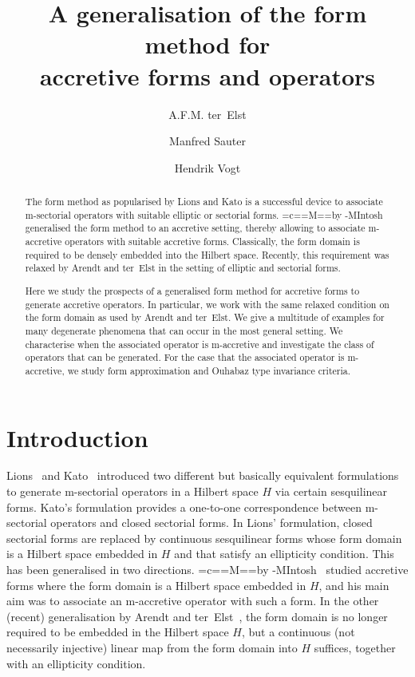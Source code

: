 \documentclass[a4paper,oneside,12pt]{amsart}
\title[The form method for accretive forms]{A generalisation of the form method for\\ accretive forms and operators}
\author{A.F.M. ter~Elst}
\author[M. Sauter]{Manfred Sauter}
\author[H. Vogt]{Hendrik Vogt}
\theoremstyle{plain}
\theoremstyle{definition}
\DeclareRobustCommand{\Mc}{\setbox0=\hbox{c}\mycheight=\ht0\setbox0=\hbox{M}\myMheight=\ht0\mycshift=\myMheight\advance\mycshift by -\mycheight\mbox{M\raisebox{\mycshift}{c}I}}
\DeclareRobustCommand{\McIntosh}{{\Mc}ntosh\xspace}
\begin{document}
\begin{abstract}
The form method as popularised by Lions and Kato is a successful device to associate {\ensuremath{\text{m}}}-sectorial operators with suitable elliptic or sectorial forms.
\McIntosh generalised the form method to an accretive setting, thereby allowing to associate {\ensuremath{\text{m}}}-accretive operators with suitable accretive forms.
Classically, the form domain is required to be densely embedded into the Hilbert space.
Recently, this requirement was relaxed by Arendt and ter~Elst 
in the setting of elliptic and sectorial forms.

Here we study the prospects of a generalised form method for accretive forms to generate accretive operators.
In particular, we work with the same relaxed condition on the form domain as used by Arendt and ter~Elst.
We give a multitude of examples for many degenerate phenomena that can
occur in the most general setting. We characterise when the associated operator is {\ensuremath{\text{m}}}-accretive
and investigate the class of operators that can be generated. 
For the case that the associated operator is {\ensuremath{\text{m}}}-accretive, we study form approximation and Ouhabaz type invariance criteria.
\end{abstract}
\maketitle

\section{Introduction}

Lions~\cite[Theorem~3.6]{Lions57} and Kato~\cite[Subsection VI.2.1]{Kato66:1ed} 
introduced two different but basically equivalent formulations to
generate {\ensuremath{\text{m}}}-sectorial operators in a Hilbert space $H$ via certain sesquilinear forms. 
Kato's formulation provides a one-to-one correspondence between {\ensuremath{\text{m}}}-sectorial operators and
closed sectorial forms.
In Lions' formulation, closed sectorial forms are replaced by continuous sesquilinear forms whose form domain is a Hilbert space embedded in $H$ and that satisfy an ellipticity condition. This has been generalised in two directions. 
\McIntosh~\cite{McIntosh1968:repres} studied accretive forms where the form domain is a Hilbert space embedded in $H$, and his main aim was to associate
an {\ensuremath{\text{m}}}-accretive operator with such a form. In the other (recent) generalisation by Arendt and ter~Elst~\cite{AtE12:sect-form}, the form domain is
no longer required to be embedded in the Hilbert space $H$, but a continuous (not necessarily injective) linear map from the form domain into $H$ suffices, together with an ellipticity condition.
\end{document}
